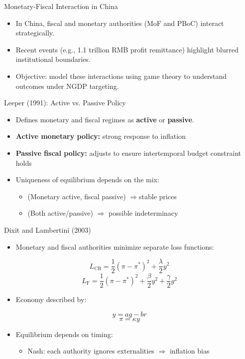 \documentclass{beamer}
\begin{document}
\begin{frame}{Monetary-Fiscal Interaction in China}
\begin{itemize}
    \item In China, fiscal and monetary authorities (MoF and PBoC) interact strategically.
    \item Recent events (e.g., 1.1 trillion RMB profit remittance) highlight blurred institutional boundaries.
    \item Objective: model these interactions using game theory to understand outcomes under NGDP targeting.
\end{itemize}
\end{frame}

\begin{frame}{Leeper (1991): Active vs. Passive Policy}
\begin{itemize}
    \item Defines monetary and fiscal regimes as \textbf{active} or \textbf{passive}.
    \item \textbf{Active monetary policy:} strong response to inflation
    \item \textbf{Passive fiscal policy:} adjusts to ensure intertemporal budget constraint holds
    \item Uniqueness of equilibrium depends on the mix:
    \begin{itemize}
        \item (Monetary active, fiscal passive) $\Rightarrow$stable prices
        \item (Both active/passive) $\Rightarrow$ possible indeterminacy
    \end{itemize}
\end{itemize}
\end{frame}

\begin{frame}{Dixit and Lambertini (2003)}
\begin{itemize}
    \item Monetary and fiscal authorities minimize separate loss functions:
\end{itemize}
\[
    L_{\text{CB}} = \frac{1}{2}(\pi - \pi^*)^2 + \frac{\lambda}{2}y^2
\]
\[
    L_{\text{F}} = \frac{1}{2}(\pi - \pi^*)^2 + \frac{\beta}{2}y^2 + \frac{\gamma}{2}g^2
\]
\begin{itemize}
    \item Economy described by:
\end{itemize}
\[
    y = a g - b r
\]
\[
    \pi = \kappa y
\]
\begin{itemize}
    \item Equilibrium depends on timing:
    \begin{itemize}
        \item Nash: each authority ignores externalities $\Rightarrow$ inflation bias
    \end{itemize}
\end{itemize}
\end{frame}
\end{document}
